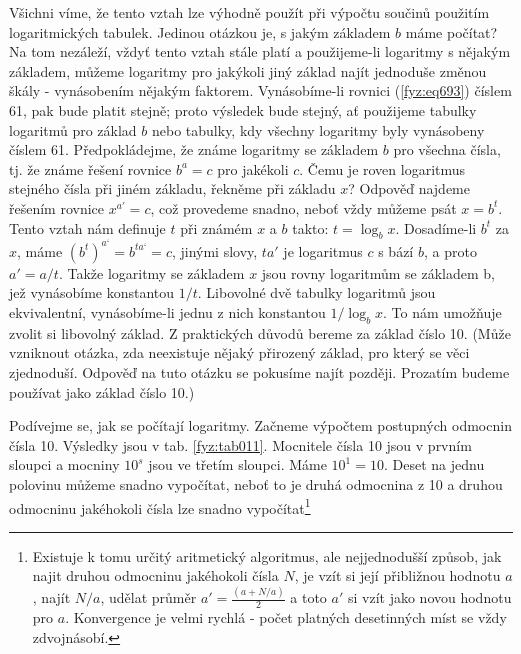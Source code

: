     Všichni víme, že tento vztah lze výhodně použít při výpočtu součinů použitím logaritmických
    tabulek. Jedinou otázkou je, s jakým základem \(b\) máme počítat? Na tom nezáleží, vždyť tento
    vztah stále platí a použijeme-li logaritmy s nějakým základem, můžeme logaritmy pro jakýkoli
    jiný základ najít jednoduše změnou škály - vynásobením nějakým faktorem. Vynásobíme-li rovnici
    (\ref{fyz:eq693}) číslem \num{61}, pak bude platit stejně; proto výsledek bude stejný, ať
    použijeme tabulky logaritmů pro základ \(b\) nebo tabulky, kdy všechny logaritmy byly vynásobeny
    číslem \num{61}. Předpokládejme, že známe logaritmy se základem \(b\) pro všechna čísla, tj. že
    známe řešení rovnice \(b^a = c\) pro jakékoli \(c\). Čemu je roven logaritmus stejného čísla při
    jiném základu, řekněme při základu \(x\)? Odpověď najdeme řešením rovnice \(x^{a'} = c\), což
    provedeme snadno, neboť vždy můžeme psát \(x = b^t\). Tento vztah nám deﬁnuje \(t\) při známém
    \(x\) a \(b\) takto: \(t= \log_bx\). Dosadíme-li \(b^t\) za \(x\), máme \((b^t)^{a‘}=b^{ta
    ‘}=c\), jinými slovy, \(ta'\) je logaritmus \(c\) s bází \(b\), a proto \(a' =a/t\). Takže
    logaritmy se základem \(x\) jsou rovny logaritmům se základem b, jež vynásobíme konstantou
    \(1/t\). Libovolné dvě tabulky logaritmů jsou ekvivalentní, vynásobíme-li jednu z nich
    konstantou \(1/\log_bx\). To nám umožňuje zvolit si libovolný základ. Z praktických důvodů
    bereme za základ číslo 10. (Může vzniknout otázka, zda neexistuje nějaký přirozený základ, pro
    který se věci zjednoduší. Odpověď na tuto otázku se pokusíme najít později. Prozatím budeme
    používat jako základ číslo 10.)

    Podívejme se, jak se počítají logaritmy. Začneme výpočtem postupných odmocnin čísla \num{10}.
    Výsledky jsou v tab. \ref{fyz:tab011}. Mocnitele čísla \num{10} jsou v prvním sloupci a mocniny
    \(10^s\) jsou ve třetím sloupci. Máme \(10^1 = 10\). Deset na jednu polovinu můžeme snadno
    vypočítat, neboť to je druhá odmocnina z \num{10} a druhou odmocninu jakéhokoli čísla lze snadno
    vypočítat\footnote{ Existuje k tomu určitý aritmetický algoritmus, ale nejjednodušší způsob, jak
    najit druhou odmocninu jakéhokoli čísla \(N\), je vzít si její přibližnou hodnotu \(a\), najít
    \(N/a\), udělat průměr \(a' =\frac{(a + N/a)}{2}\) a toto \(a'\) si vzít jako novou hodnotu pro
    \(a\). Konvergence je velmi rychlá - počet platných desetinných míst se vždy zdvojnásobí.}

